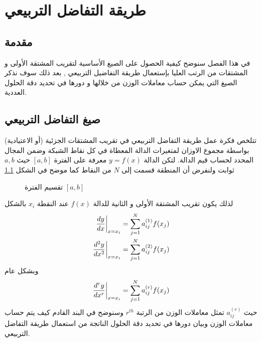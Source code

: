 \chapter{طريقة التفاضل التربيعي}
\section[مقدمة]{مقدمة }

في هذا الفصل سنوضح كيفية الحصول على الصيغ الأساسية لتقريب المشتقة الأولى و المشتقات من الرتب العليا بإستعمال طريقة التفاضيل التربيعي , بعد ذلك سوف نذكر الصيغ التي يمكن حساب معاملات الوزن من خلالها و دورها في تحديد دقة الحلول العددية.

\section[صيغ التفاضل التربيعي]{صيغ التفاضل التربيعي }

تتلخص فكرة عمل طريقة التفاضل التربيعي في تقريب المشتقات الجزئية (أو الاعتيادية) بواسطة مجموع الاوزان لمتغيرات الدالة المعطاة في كل نقاط الشبكة وضمن المجال المحدد لحساب قيم الدالة. لتكن الدالة $y=f(x)$ معرفة على الفترة $[a,b]$ حيث $a,b$ ثوابت ولنفرض أن المنطقة قسمت إلى $N$ من النقاط كما موضح في الشكل \ref{fig:numberline}\cite{chang_shu}

\begin{figure}[H]
	\centering
	
	\caption{تقسيم الفترة $[a,b]$}
	\label{fig:numberline}
\end{figure}

لذلك يكون تقريب المشتقة الأولى و الثانية للدالة $f(x)$ عند النقطة $x_i$ بالشكل
\begin{align}
	\left.\frac{dy}{dx}\right|_{x=x_i}=\sum_{j=1}^{N}a_{ij}^{(1)}f(x_j) \label{eq:firstorderDQM}\\
	\left.\frac{d^2y}{dx^2}\right|_{x=x_i}=\sum_{j=1}^{N}a_{ij}^{(2)}f(x_j) \label{eq:secondorderDQM}
\end{align}
وبشكل عام
\begin{equation}
	\label{eq:DQM_formula}
	\left.\frac{d^ry}{dx^r}\right|_{x=x_i}=\sum_{j=1}^{N}a_{ij}^{(r)}f(x_j)
\end{equation}
حيث $a_{ij}^{(r)}$ تمثل معاملات الوزن من الرتبة $r^{th}$ وسنوضح في البند القادم كيف يتم حساب معاملات الوزن وبيان دورها في تحديد دقة الحلول الناتجة من استعمال طريقة التفاضل التربيعي.

